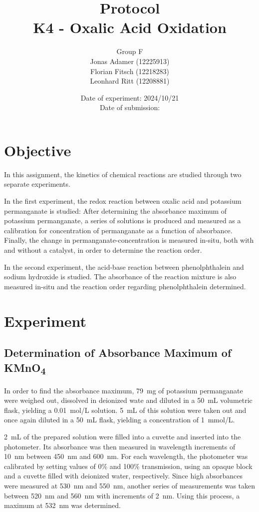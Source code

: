 \documentclass[titlepage]{article}
\title{Protocol \\ K4 - Oxalic Acid Oxidation}
\author{Group F\\Jonas Adamer (12225913)\\Florian Fitsch (12218283)\\Leonhard Ritt (12208881)}
\date{Date of experiment: 2024/10/21\\Date of submission:}
\begin{document}
\maketitle
\thispagestyle{empty}

\newpage
\tableofcontents
\thispagestyle{empty}

\addtocounter{page}{-1}

\newpage
\section{Objective}
In this assignment, the kinetics of chemical reactions are studied through two separate experiments.

In the first experiment, the redox reaction between oxalic acid and potassium permanganate is studied: After determining the absorbance maximum of potassium permanganate, a series of solutions is produced and measured as a calibration for concentration of permanganate as a function of absorbance. Finally, the change in permanganate-concentration is measured in-situ, both with and without a catalyst, in order to determine the reaction order.

In the second experiment, the acid-base reaction between phenolphthalein and sodium hydroxide is studied. The absorbance of the reaction mixture is also measured in-situ and the reaction order regarding phenolphthalein determined.

\section{Experiment}
\subsection{Determination of Absorbance Maximum of KMnO\texorpdfstring{\textsubscript{4}}{4}} \label{ssec_experiment_abs_maximum}
In order to find the absorbance maximum, 79~mg of potassium permanganate were weighed out, dissolved in deionized wate and diluted in a 50~mL volumetric flask, yielding a 0.01~mol/L solution. 5~mL of this solution were taken out and once again diluted in a 50~mL flask, yielding a concentration of 1~mmol/L.

2~mL of the prepared solution were filled into a cuvette and inserted into the photometer. Its absorbance was then measured in wavelength increments of 10~nm between 450~nm and 600~nm. For each wavelength, the photometer was calibrated by setting values of 0\% and 100\% transmission, using an opaque block and a cuvette filled with deionized water, respectively. Since high absorbances were measured at 530~nm and 550~nm, another series of measurements was taken between 520~nm and 560~nm with increments of 2~nm. Using this process, a maximum at 532~nm was determined.
\end{document}
